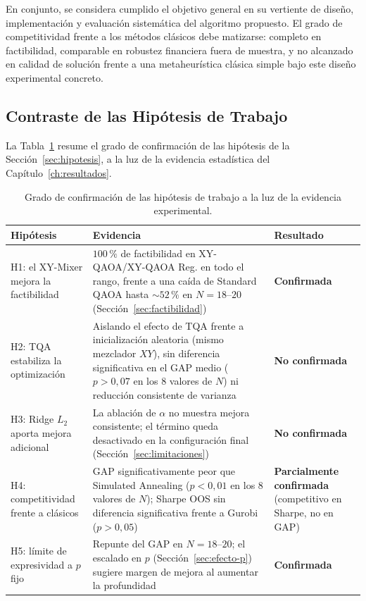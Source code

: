 En conjunto, se considera cumplido el objetivo general en su vertiente de diseño, implementación y evaluación
sistemática del algoritmo propuesto. El grado de competitividad frente a los métodos clásicos debe matizarse:
completo en factibilidad, comparable en robustez financiera fuera de muestra, y no alcanzado en calidad de
solución frente a una metaheurística clásica simple bajo este diseño experimental concreto.

\subsection{Contraste de las Hipótesis de Trabajo}

La Tabla~\ref{tab:hipotesis} resume el grado de confirmación de las hipótesis de la Sección~\ref{sec:hipotesis},
a la luz de la evidencia estadística del Capítulo~\ref{ch:resultados}.

\begin{table}[htbp]
\centering
\small
\caption{Grado de confirmación de las hipótesis de trabajo a la luz de la evidencia experimental.}
\label{tab:hipotesis}
\begin{tabular}{p{2.6cm}p{7.2cm}p{2.8cm}}
\toprule
\textbf{Hipótesis} & \textbf{Evidencia} & \textbf{Resultado} \\
\midrule
H1: el XY-Mixer mejora la factibilidad &
$100\,\%$ de factibilidad en XY-QAOA/XY-QAOA Reg. en todo el rango, frente a una caída de
Standard QAOA hasta $\sim\!52\,\%$ en $N=18$--$20$ (Sección~\ref{sec:factibilidad}) &
\textbf{Confirmada} \\
\addlinespace
H2: TQA estabiliza la optimización &
Aislando el efecto de TQA frente a inicialización aleatoria (mismo mezclador $XY$), sin
diferencia significativa en el GAP medio ($p>0{,}07$ en los 8 valores de $N$) ni reducción
consistente de varianza &
\textbf{No confirmada} \\
\addlinespace
H3: Ridge $L_2$ aporta mejora adicional &
La ablación de $\alpha$ no muestra mejora consistente; el término queda desactivado en la
configuración final (Sección~\ref{sec:limitaciones}) &
\textbf{No confirmada} \\
\addlinespace
H4: competitividad frente a clásicos &
GAP significativamente peor que Simulated Annealing ($p<0{,}01$ en los 8 valores de $N$);
Sharpe OOS sin diferencia significativa frente a Gurobi ($p>0{,}05$) &
\textbf{Parcialmente confirmada} (competitivo en Sharpe, no en GAP) \\
\addlinespace
H5: límite de expresividad a $p$ fijo &
Repunte del GAP en $N=18$--$20$; el escalado en $p$ (Sección~\ref{sec:efecto-p}) sugiere
margen de mejora al aumentar la profundidad &
\textbf{Confirmada} \\
\bottomrule
\end{tabular}
\end{table}

